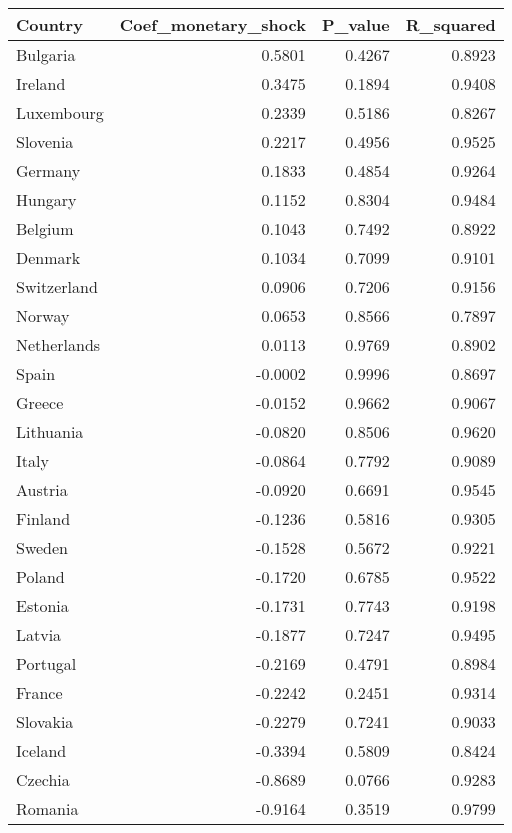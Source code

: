 \begin{tabular}{lrrr}
\toprule
Country & Coef_monetary_shock & P_value & R_squared \\
\midrule
Bulgaria & 0.5801 & 0.4267 & 0.8923 \\
Ireland & 0.3475 & 0.1894 & 0.9408 \\
Luxembourg & 0.2339 & 0.5186 & 0.8267 \\
Slovenia & 0.2217 & 0.4956 & 0.9525 \\
Germany & 0.1833 & 0.4854 & 0.9264 \\
Hungary & 0.1152 & 0.8304 & 0.9484 \\
Belgium & 0.1043 & 0.7492 & 0.8922 \\
Denmark & 0.1034 & 0.7099 & 0.9101 \\
Switzerland & 0.0906 & 0.7206 & 0.9156 \\
Norway & 0.0653 & 0.8566 & 0.7897 \\
Netherlands & 0.0113 & 0.9769 & 0.8902 \\
Spain & -0.0002 & 0.9996 & 0.8697 \\
Greece & -0.0152 & 0.9662 & 0.9067 \\
Lithuania & -0.0820 & 0.8506 & 0.9620 \\
Italy & -0.0864 & 0.7792 & 0.9089 \\
Austria & -0.0920 & 0.6691 & 0.9545 \\
Finland & -0.1236 & 0.5816 & 0.9305 \\
Sweden & -0.1528 & 0.5672 & 0.9221 \\
Poland & -0.1720 & 0.6785 & 0.9522 \\
Estonia & -0.1731 & 0.7743 & 0.9198 \\
Latvia & -0.1877 & 0.7247 & 0.9495 \\
Portugal & -0.2169 & 0.4791 & 0.8984 \\
France & -0.2242 & 0.2451 & 0.9314 \\
Slovakia & -0.2279 & 0.7241 & 0.9033 \\
Iceland & -0.3394 & 0.5809 & 0.8424 \\
Czechia & -0.8689 & 0.0766 & 0.9283 \\
Romania & -0.9164 & 0.3519 & 0.9799 \\
\bottomrule
\end{tabular}

